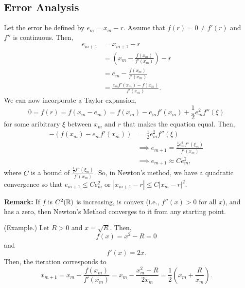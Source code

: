 \documentclass[letterpaper]{article}
\begin{document}
\subsection{Error Analysis}
Let the error be defined by $e_m = x_m - r$. Assume that $f(r) = 0 \neq f'(r)$ and $f''$ is continuous. Then, 
\[\begin{aligned}
    e_{m + 1} &= x_{m + 1} - r \\ 
        &= \left(x_m - \frac{f(x_m)}{f'(x_m)}\right) - r \\
        &= e_m - \frac{f(x_m)}{f'(x_m)} \\ 
        &= \frac{e_m f'(x_m) - f(x_m)}{f'(x_m)}.
\end{aligned}\]
We can now incorporate a Taylor expansion, 
\[0 = f(r) = f(x_m - e_m) = f(x_m) - e_m f'(x_m) + \frac{1}{2}e_m^2 f''(\xi)\]
for some aribitrary $\xi$ between $x_m$ and $r$ that makes the equation equal. Then, 
\begin{equation*}
    \begin{aligned}
        -(f(x_m) - e_m f'(x_m)) &= \frac{1}{2}e_m^2 f''(\xi) \\ 
            &\implies e_{m + 1} = \frac{\frac{1}{2} e_m^2 f''(\xi_m)}{f'(x_m)} \\ 
            &\implies e_{m + 1} \approx Ce_m^2,
    \end{aligned}
\end{equation*}
where $C$ is a bound of $\frac{\frac{1}{2} f''(\xi_m)}{f'(x_m)}$. So, in Newton's method, we have a quadratic convergence so that $e_{m + 1} \leq Ce_m^2$ or $|x_{m + 1} - r| \leq C |x_m - r|^2.$ 

\bigskip 

\textbf{Remark:} If $f$ is $C^2 (\mathbb{R})$ is increasing, is convex (i.e., $f''(x) > 0$ for all $x$), and has a zero, then Newton's Method converges to it from any starting point.

\begin{mdframed}
    (Example.) Let $R > 0$ and $x = \sqrt{R}$. Then, 
    \[f(x) = x^2 - R = 0\] and \[f'(x) = 2x.\] Then, the iteration corresponds to \[x_{m + 1} = x_m - \frac{f(x_m)}{f'(x_m)} = x_m - \frac{x_m^2 - R}{2x_m} = \frac{1}{2}\left(x_m + \frac{R}{x_m}\right).\] 
\end{mdframed}
\end{document}
